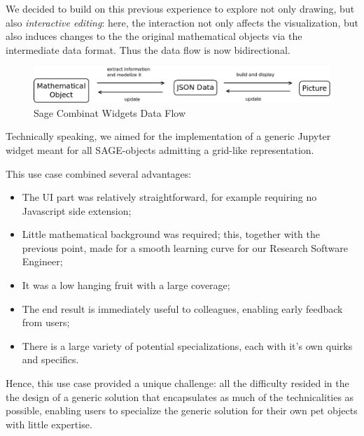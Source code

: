 \documentclass{deliverablereport}
\begin{document}
We decided to build on this previous experience to explore not only
drawing, but also \emph{interactive editing}: here, the interaction
not only affects the visualization, but also induces changes to the
the original mathematical objects via the intermediate data format.
Thus the data flow is now bidirectional.

\begin{figure}[h]
  \begin{center}
    \includegraphics[width=\textwidth]{schemas/DoubleSens}
  \end{center}
  \caption{Sage Combinat Widgets Data Flow}
  \label{fig:dataflow1}
\end{figure}

Technically speaking, we aimed for the implementation of a generic
Jupyter widget meant for all SAGE-objects admitting a grid-like
representation.


This use case combined several advantages:
\begin{itemize}
\item The UI part was relatively straightforward, for example
  requiring no Javascript side extension;
\item Little mathematical background was required; this, together with
  the previous point, made for a smooth learning curve for our
  Research Software Engineer;
\item It was a low hanging fruit with a large coverage;
\item The end result is immediately useful to colleagues, enabling
  early feedback from users;
\item There is a large variety of potential specializations, each with
  it's own quirks and specifics.
\end{itemize}
Hence, this use case provided a unique challenge: all the difficulty
resided in the the design of a generic solution that encapsulates as
much of the technicalities as possible, enabling users to specialize
the generic solution for their own pet objects with little expertise.
\end{document}
